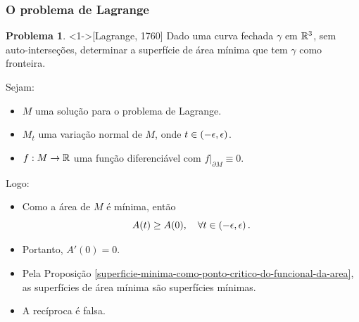 \documentclass[12pt,a4paper]{beamer}
\theoremstyle{definition}
\newtheorem*{problema}{Problema}
\begin{document}
\begin{frame}
	\frametitle{O problema de Lagrange}
	
	\begin{problema}<1->[Lagrange, 1760]
		Dado uma curva fechada $\gamma$ em $\mathbb R^3$, sem auto-interseções, determinar a \alert{superfície de área mínima} que tem $\gamma$ como fronteira.
	\end{problema}
	
	\pause
	Sejam:
	\begin{itemize}
		\item $M$ uma solução para o problema de Lagrange.
		\pause
		\item $M_t$ uma variação normal de $M$, onde $t \in \left( -\epsilon,\epsilon \right)$.
		\pause
		\item $f: M \rightarrow \mathbb R$ uma função diferenciável com $f \vert_{\partial M} \equiv 0$.
	\end{itemize}

	
	
	
\end{frame}

\begin{frame}
	Logo:
	\begin{itemize}
		\item Como a área de $M$ é mínima, então
		\begin{equation*}
		A(t) \geq A(0), \quad \forall t \in \left( -\epsilon,\epsilon \right).
		\end{equation*}
		\pause
		\item Portanto, $A'(0) = 0$.
		\pause
		\item Pela Proposição \ref{superficie-minima-como-ponto-critico-do-funcional-da-area}, as superfícies de área mínima são superfícies mínimas.
		\pause
		\item A recíproca é falsa.
	\end{itemize}
\end{frame}
\end{document}
